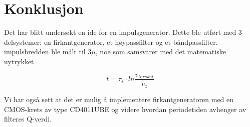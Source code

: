 \section{Konklusjon}
\label{sec:conclusion}

Det har blitt undersøkt en ide for en impulsgenerator. Dette ble utført med 3 delsystemer; en firkantgenerator, et høypassfilter og et båndpassfilter. impulsbredden ble målt til $3\mu$, noe som samsvarer med det matematiske uytrykket

\begin{equation}
    t=\tau _s\cdot ln\frac{v_{terskel}}{v_z}
\end{equation}

Vi har også sett at det er mulig å implementere firkantgeneratoren med en CMOS-krets av type CD4011UBE og videre hvordan periodetiden avhenger av filteres Q-verdi.